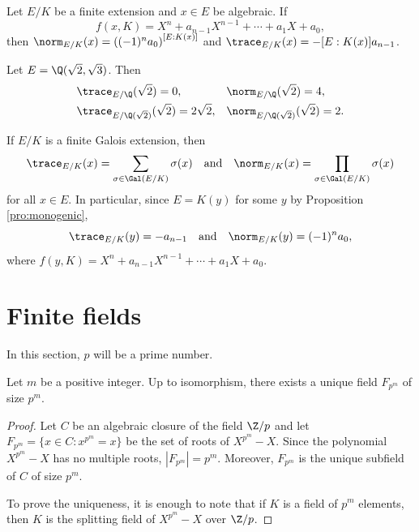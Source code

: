 \begin{exercise}
        Let $E/K$ be a finite extension and
        $x\in E$ be algebraic. If
        \[
        f(x,K)=X^n+a_{n-1}X^{n-1}+\cdots+a_1X+a_0,
        \]
        then 
        $\norm_{E/K}(x)=\left((-1)^na_0\right)^{[E:K(x)]}$ and 
        $\trace_{E/K}(x)=-[E:K(x)]a_{n-1}$. 
\end{exercise}

\begin{example}
    Let $E=\Q(\sqrt{2},\sqrt{3})$. Then 
    \begin{align*}
    &\trace_{E/\Q}(\sqrt{2})=0,
    &&
    \norm_{E/\Q}(\sqrt{2})=4,\\
    &\trace_{E/\Q(\sqrt{2})}(\sqrt{2})=2\sqrt{2},
    &&\norm_{E/\Q(\sqrt{2})}(\sqrt{2})=2.    
    \end{align*}
\end{example}

\begin{example}
    If $E/K$ is a finite Galois extension, then 
    \[
    \trace_{E/K}(x)=\sum_{\sigma\in\Gal(E/K)}\sigma(x)
    \quad\text{and}\quad
    \norm_{E/K}(x)=\prod_{\sigma\in\Gal(E/K)}\sigma(x)
    \]
    for all $x\in E$. In particular, since $E=K(y)$ for some
    $y$ by Proposition \ref{pro:monogenic}, 
    \[
    \trace_{E/K}(y)=-a_{n-1}
    \quad\text{and}\quad
    \norm_{E/K}(y)=(-1)^na_0,
    \]
    where
    $f(y,K)=X^n+a_{n-1}X^{n-1}+\cdots+a_1X+a_0$.
\end{example}        

\section{Finite fields}

In this section, $p$ will be a prime number. 

\begin{proposition}
    Let $m$ be a positive integer. 
    Up to isomorphism, there exists a unique 
    field $F_{p^m}$ of size $p^m$. 
\end{proposition}

\begin{proof}
    Let $C$ be an algebraic closure of the field $\Z/p$ and 
    let $F_{p^m}=\{x\in C:x^{p^m}=x\}$ be the set of roots of $X^{p^m}-X$. Since 
    the polynomial $X^{p^m}-X$ has no multiple roots, $|F_{p^m}|=p^m$. Moreover, 
    $F_{p^m}$ is the unique subfield of $C$ of size $p^m$. 
    
    To prove the uniqueness, it is enough to note that 
    if $K$ is a field of $p^m$ elements, then
    $K$ is the splitting field of $X^{p^m}-X$ over $\Z/p$.  
\end{proof}


